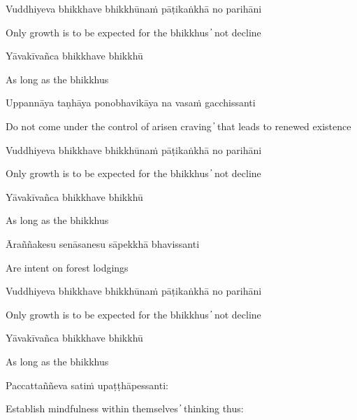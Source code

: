 Vuddhiyeva bhikkhave bhikkhūnaṁ pāṭikaṅkhā no parihāni

\begin{cprenglish}
Only growth is to be expected for the bhikkhus  ̓  not decline
\end{cprenglish}

Yāvakīvañca bhikkhave bhikkhū

\begin{cprenglish}
As long as the bhikkhus
\end{cprenglish}

Uppannāya taṇhāya ponobhavikāya na vasaṁ gacchissanti

\begin{cprenglish}
Do not come under the control of arisen craving  ̓  that leads to renewed existence
\end{cprenglish}

Vuddhiyeva bhikkhave bhikkhūnaṁ pāṭikaṅkhā no parihāni

\begin{cprenglish}
Only growth is to be expected for the bhikkhus  ̓  not decline
\end{cprenglish}

Yāvakīvañca bhikkhave bhikkhū

\begin{cprenglish}
As long as the bhikkhus
\end{cprenglish}

Āraññakesu senāsanesu sāpekkhā bhavissanti

\begin{cprenglish}
Are intent on forest lodgings
\end{cprenglish}

Vuddhiyeva bhikkhave bhikkhūnaṁ pāṭikaṅkhā no parihāni

\begin{cprenglish}
Only growth is to be expected for the bhikkhus  ̓  not decline
\end{cprenglish}

Yāvakīvañca bhikkhave bhikkhū

\begin{cprenglish}
As long as the bhikkhus
\end{cprenglish}

Paccattaññeva satiṁ upaṭṭhāpessanti:

\begin{cprenglish}
Establish mindfulness within themselves  ̓  thinking thus:
\end{cprenglish}

